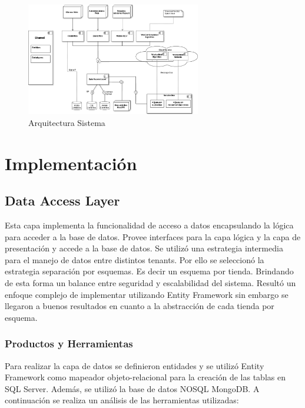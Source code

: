 \documentclass[journal]{IEEEtran}
\begin{document}
\begin{figure}[!h]
  \centering
    \includegraphics[width=3in]{./figuras/arquitectura.png}
  \caption{Arquitectura Sistema}
  \label{fig:arq}
\end{figure} 



\section{Implementación}

\subsection{Data Access Layer}
Esta capa implementa la funcionalidad de acceso a datos encapsulando la lógica para acceder a la base de datos. Provee interfaces para la capa lógica y la capa de presentación y accede a la base de datos. 
Se utilizó una estrategia intermedia para el manejo de datos entre distintos tenants. Por ello se seleccionó la estrategia separación por esquemas. Es decir un esquema por tienda. Brindando de esta forma un balance entre seguridad y escalabilidad del sistema. Resultó un enfoque complejo de implementar utilizando Entity Framework sin embargo se llegaron a buenos resultados en cuanto a la abstracción de cada tienda por esquema.\cite{url:schemadb}

\subsubsection{Productos y Herramientas}
Para realizar la capa de datos se definieron entidades y se utilizó Entity Framework como mapeador objeto-relacional para la creación de las tablas en SQL Server. Además, se utilizó la base de datos NOSQL MongoDB.
A continuación se realiza un análisis de las herramientas utilizadas: 
 
\end{document}
